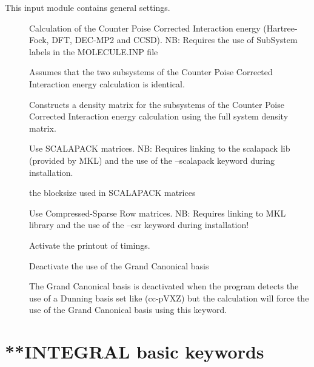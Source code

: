This input module contains general settings.
\begin{description}

\item[] Calculation of the Counter Poise Corrected Interaction energy (Hartree-Fock, DFT, DEC-MP2 and CCSD). \newline
NB: Requires the use of SubSystem labels in the MOLECULE.INP file
\item[] Assumes that the two subsystems of the Counter Poise Corrected Interaction energy calculation is identical.
\item[] Constructs a density matrix for the subsystems of the Counter Poise Corrected Interaction energy calculation using the full system density matrix.  
\item[] Use SCALAPACK matrices. \newline
NB: Requires linking to the scalapack lib (provided by MKL) and the use of the --scalapack keyword during installation.
\item[] the blocksize used in SCALAPACK matrices
\item[] Use Compressed-Sparse Row matrices. NB: Requires linking to MKL library and the use of the --csr keyword during installation!
\item[] Activate the printout of timings.
\item[] Deactivate the use of the Grand Canonical basis \cite{trilevel1, trilevel2}
\item[] The Grand Canonical basis \cite{trilevel1, trilevel2} is deactivated when the program
detects the use of a Dunning basis set like (cc-pVXZ) but the calculation will force the use of the Grand Canonical basis using this keyword.

\end{description}
\section{**INTEGRAL basic keywords}\label{sec:integral}

